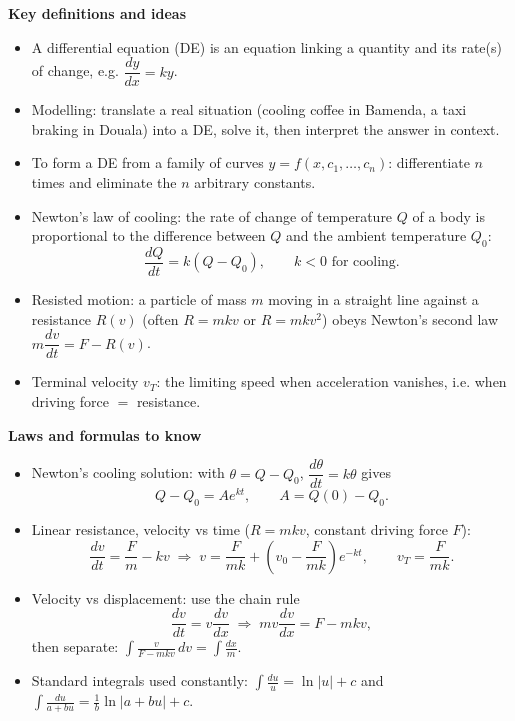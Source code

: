 \documentclass[11pt]{article}
\newcommand{\cle}[1]{{\popxbold\color{popdark}#1}}
\begin{document}
\begin{bilan}
\textbf{Key definitions and ideas}
\begin{itemize}
\item A \cle{differential equation} (DE) is an equation linking a quantity and its rate(s) of change, e.g. $\dfrac{dy}{dx}=ky$.
\item \cle{Modelling}: translate a real situation (cooling coffee in Bamenda, a taxi braking in Douala) into a DE, solve it, then interpret the answer in context.
\item To \cle{form a DE from a family of curves} $y=f(x,c_1,\ldots,c_n)$: differentiate $n$ times and eliminate the $n$ arbitrary constants.
\item \cle{Newton's law of cooling}: the rate of change of temperature $Q$ of a body is proportional to the difference between $Q$ and the ambient temperature $Q_0$:
\[ \frac{dQ}{dt}=k(Q-Q_0), \qquad k<0 \text{ for cooling.} \]
\item \cle{Resisted motion}: a particle of mass $m$ moving in a straight line against a resistance $R(v)$ (often $R=mkv$ or $R=mkv^2$) obeys Newton's second law $m\dfrac{dv}{dt}=F-R(v)$.
\item \cle{Terminal velocity} $v_T$: the limiting speed when acceleration vanishes, i.e. when driving force $=$ resistance.
\end{itemize}

\textbf{Laws and formulas to know}
\begin{itemize}
\item Newton's cooling solution: with $\theta=Q-Q_0$, $\dfrac{d\theta}{dt}=k\theta$ gives
\[ Q-Q_0=Ae^{kt}, \qquad A=Q(0)-Q_0. \]
\item Linear resistance, velocity vs time ($R=mkv$, constant driving force $F$):
\[ \frac{dv}{dt}=\frac{F}{m}-kv \;\Longrightarrow\; v=\frac{F}{mk}+\left(v_0-\frac{F}{mk}\right)e^{-kt}, \qquad v_T=\frac{F}{mk}. \]
\item Velocity vs displacement: use the chain rule
\[ \frac{dv}{dt}=v\frac{dv}{dx} \;\Longrightarrow\; mv\frac{dv}{dx}=F-mkv, \]
then separate: $\displaystyle \int \frac{v}{F-mkv}\,dv=\int \frac{dx}{m}$.
\item Standard integrals used constantly: $\displaystyle\int\frac{du}{u}=\ln|u|+c$ and $\displaystyle\int\frac{du}{a+bu}=\frac{1}{b}\ln|a+bu|+c$.
\end{itemize}


\end{bilan}
\end{document}
